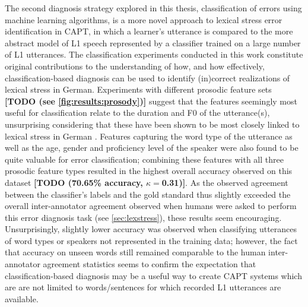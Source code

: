\documentclass[11pt,a4paper,onecolumn]{article}
\newcommand{\TODO}[1]{{\color{red}\textbf{[TODO #1]}}}
\begin{document}
	The second diagnosis strategy explored in this thesis, classification of errors using machine learning algorithms, is a more novel approach to lexical stress error identification in CAPT, in which a learner's utterance is compared to the more abstract model of L1 speech represented by a classifier trained on a large number of L1 utterances. The classification experiments conducted in this work %
	constitute original contributions to the understanding of how, and how effectively, classification-based diagnosis can be used to identify (in)correct realizations of lexical stress in German. 
	Experiments with different prosodic feature sets \TODO{(see \cref{fig:results:prosody})} suggest that the features seemingly most useful for classification relate to the duration and F0 of the utterance(s), unsurprising considering that these have been shown to be most closely linked to lexical stress in German \citep{Cutler2005,Dogil1999}. Features capturing the word type of the utterance as well as the age, gender and proficiency level of the speaker were also found to be quite valuable for error classification; combining these features with all three prosodic feature types resulted in the highest overall accuracy observed on this dataset \TODO{(70.65\% accuracy, $\kappa=$0.31)}. As the observed agreement between the classifier's labels and the gold standard thus slightly exceeded the overall inter-annotator agreement observed when humans were asked to perform this error diagnosis task (see \cref{sec:lexstress}), these results seem encouraging. Unsurprisingly, slightly lower accuracy was observed when classifying utterances of word types or speakers not represented in the training data; however, the fact that accuracy on unseen words still remained comparable to the human inter-annotator agreement statistics seems to confirm the expectation that classification-based diagnosis may be a useful way to create CAPT systems which are are not limited to words/sentences for which recorded L1 utterances are available.
	
\end{document}
